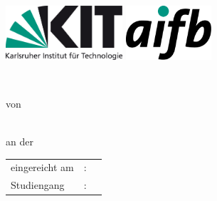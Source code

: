 \begin{titlepage}
	\begin{addmargin}{-3cm}
    \includegraphics[height=2cm]{images/kit.jpg}
    \hfill
    \includegraphics[height=2cm]{images/aifb.png}
    \begin{center}
        \large  
		
        \vfill
        
        \LARGE {\spacedallcaps \myTitle} \\
        
        \vfill
        
        \large \myTypeOfWork von \\ %
        \smallskip
        \large \spacedallcaps{\myName} \\ 
        
        \vfill
        
        \large an der \myDepartment \\ %
        \vspace{0.5cm}
        \begin{tabular}{lll}
        	  eingereicht am & : & \myTime \\
        	  Studiengang & : & \myCourse \\
        \end{tabular}

        \vfill
        
        \myInstitute \\
		\myUni
    \end{center}  
  \end{addmargin}       
\end{titlepage}   